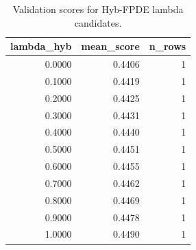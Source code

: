 \begin{table}[t]
\caption{Validation scores for Hyb-FPDE lambda candidates.}
\label{tab:lambda_distribution_computed}
\centering
\begin{tabular}{rrr}
\toprule
lambda\_hyb & mean\_score & n\_rows \\
\midrule
0.0000 & 0.4406 & 1 \\
0.1000 & 0.4419 & 1 \\
0.2000 & 0.4425 & 1 \\
0.3000 & 0.4431 & 1 \\
0.4000 & 0.4440 & 1 \\
0.5000 & 0.4451 & 1 \\
0.6000 & 0.4455 & 1 \\
0.7000 & 0.4462 & 1 \\
0.8000 & 0.4469 & 1 \\
0.9000 & 0.4478 & 1 \\
1.0000 & 0.4490 & 1 \\
\bottomrule
\end{tabular}

\end{table}
